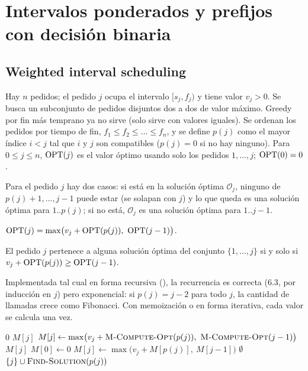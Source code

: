 \section{Intervalos ponderados y prefijos con decisión binaria}\label{pd:sec:wis}

\subsection{Weighted interval scheduling}

Hay $n$ pedidos; el pedido $j$ ocupa el intervalo $[s_j,f_j)$ y tiene valor
$v_j>0$. Se busca un subconjunto de pedidos disjuntos dos a dos de valor
máximo. Greedy por fin más temprano ya no sirve (solo sirve con valores
iguales). Se ordenan los pedidos por tiempo de fin,
$f_1\le f_2\le\dots\le f_n$, y se define $p(j)$ como el mayor índice $i<j$
tal que $i$ y $j$ son compatibles ($p(j)=0$ si no hay ninguno). Para
$0\le j\le n$, $\mathrm{OPT}(j)$ es el valor óptimo usando solo los pedidos
$1,\dots,j$; $\mathrm{OPT}(0)=0$.

Para el pedido $j$ hay dos casos: si está en la solución óptima $\mathcal{O}_j$,
ninguno de $p(j)+1,\dots,j-1$ puede estar (se solapan con $j$) y lo que queda
es una solución óptima para $1..p(j)$; si no está, $\mathcal{O}_j$ es una
solución óptima para $1..j-1$.

\begin{resultado}[(6.1)]
$\OPT(j)=\max\bigl(v_j+\OPT(p(j)),\ \OPT(j-1)\bigr)$.
\end{resultado}

\begin{resultado}[(6.2)]
El pedido $j$ pertenece a alguna solución óptima del conjunto
$\{1,\dots,j\}$ si y solo si $v_j+\mathrm{OPT}(p(j))\ge\mathrm{OPT}(j-1)$.
\end{resultado}

Implementada tal cual en forma recursiva (), la
recurrencia es correcta (6.3, por inducción en $j$) pero exponencial: si
$p(j)=j-2$ para todo $j$, la cantidad de llamadas crece como Fibonacci. Con
memoización o en forma iterativa, cada valor se calcula una vez.

\begin{algorithmic}[1]
   \Return $0$
   \Return $M[j]$
  \Else
    \State $M[j]\gets\max\bigl(v_j+\Call{M-Compute-Opt}{p(j)},\ \Call{M-Compute-Opt}{j-1}\bigr)$
    \State \Return $M[j]$
  \EndIf
\EndFunction
\Statex
{}
  \State $M[0]\gets 0$
    \State $M[j]\gets\max\bigl(v_j+M[p(j)],\ M[j-1]\bigr)$
  \EndFor
\EndFunction
\Statex
{}
   \Return $\emptyset$
    \State \Return $\{j\}\cup\Call{Find-Solution}{p(j)}$
  \Else\ \Return {}
  \EndIf
\EndFunction
\end{algorithmic}

